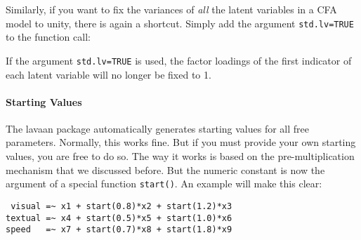 \begin{Shaded}
\begin{Highlighting}[]

\StringTok{ }
                     \NormalTok{)}
\end{Highlighting}
\end{Shaded}

Similarly, if you want to fix the variances of \emph{all} the latent
variables in a CFA model to unity, there is again a shortcut. Simply add
the argument \texttt{std.lv=TRUE} to the function call:

\begin{Shaded}
\begin{Highlighting}[]
\StringTok{ }
            \NormalTok{)}
\end{Highlighting}
\end{Shaded}

If the argument \texttt{std.lv=TRUE} is used, the factor loadings of the
first indicator of each latent variable will no longer be fixed to 1.

\hypertarget{starting-values}{%
\paragraph{Starting Values}\label{starting-values}}

The lavaan package automatically generates starting values for all free
parameters. Normally, this works fine. But if you must provide your own
starting values, you are free to do so. The way it works is based on the
pre-multiplication mechanism that we discussed before. But the numeric
constant is now the argument of a special function \texttt{start()}. An
example will make this clear:

\begin{verbatim}
 visual =~ x1 + start(0.8)*x2 + start(1.2)*x3
textual =~ x4 + start(0.5)*x5 + start(1.0)*x6
speed   =~ x7 + start(0.7)*x8 + start(1.8)*x9
\end{verbatim}

